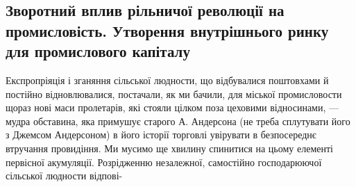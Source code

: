 \subsection {Зворотний вплив рільничої революції на промисловість.
Утворення внутрішнього ринку для промислового капіталу}

Експропріяція і зганяння сільської людности, що відбувалися
поштовхами й постійно відновлювалися, постачали, як ми бачили,
для міської промисловости щораз нові маси пролетарів, які
стояли цілком поза цеховими відносинами, — мудра обставина,
яка примушує старого А. Андерсона (не треба сплутувати його
з Джемсом Андерсоном) в його історії торговлі увірувати в безпосереднє
втручання провидіння. Ми мусимо ще хвилину спинитися
на цьому елементі первісної акумуляції. Розрідженню незалежної,
самостійно господарюючої сільської людности відпові-

\parbreak{}  %
